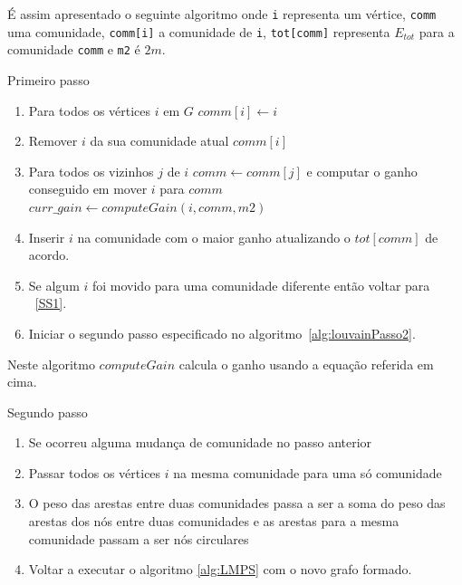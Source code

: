 É assim apresentado o seguinte algoritmo onde \verb|i| representa um vértice, \verb|comm| uma comunidade, \verb|comm[i]| a comunidade de \verb|i|, \verb|tot[comm]| representa $E_{tot}$ para a comunidade \verb|comm| e \verb|m2| é $2m$.
\begin{algorithm}
\caption{Primeiro passo}
\label{alg:LMPS}

	\begin{enumerate}
		\item Para todos os vértices $i$ em $G$ $comm[i] \gets i$
		\label{SS1}
		\item Remover $i$ da sua comunidade atual $comm[i]$
		\item Para todos os vizinhos $j$ de $i$ $comm \gets comm[j]$ e computar o ganho conseguido em mover $i$ para $comm$ $curr\_gain \gets computeGain(i,comm,m2)$
		\item Inserir $i$ na comunidade com o maior ganho atualizando o $tot[comm]$ de acordo.
		\item Se algum $i$ foi movido para uma comunidade diferente então voltar para ~\ref{SS1}.
		\item Iniciar o segundo passo especificado no algoritmo~\ref{alg:louvainPasso2}.
	\end{enumerate}
\end{algorithm}


Neste algoritmo $computeGain$ calcula o ganho usando a equação referida em cima.

\begin{algorithm}
\caption{Segundo passo}
\label{alg:louvainPasso2}
	\begin{enumerate}
		\item Se ocorreu alguma mudança de comunidade no passo anterior
		\item Passar todos os vértices $i$ na mesma comunidade para uma só comunidade
		\item O peso das arestas entre duas comunidades passa a ser a soma do peso das arestas dos nós entre duas comunidades e as arestas para a mesma comunidade passam a ser nós circulares
		\item Voltar a executar o algoritmo \ref{alg:LMPS} com o novo grafo formado.
	\end{enumerate}
\end{algorithm}

